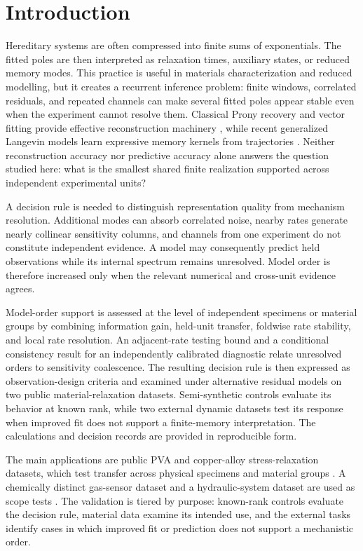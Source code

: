 \documentclass[11pt]{article}
\begin{document}
\section{Introduction}
Hereditary systems are often compressed into finite sums of exponentials. The fitted poles are then interpreted as relaxation times, auxiliary states, or reduced memory modes. This practice is useful in materials characterization and reduced modelling, but it creates a recurrent inference problem: finite windows, correlated residuals, and repeated channels can make several fitted poles appear stable even when the experiment cannot resolve them. Classical Prony recovery and vector fitting provide effective reconstruction machinery \cite{stampfer2020gop,gustavsen1999vector,bosner2021parallel}, while recent generalized Langevin models learn expressive memory kernels from trajectories \cite{lei2016parameterization,ge2024state,lang2026learning}. Neither reconstruction accuracy nor predictive accuracy alone answers the question studied here: what is the smallest shared finite realization supported across independent experimental units?

A decision rule is needed to distinguish representation quality from mechanism resolution. Additional modes can absorb correlated noise, nearby rates generate nearly collinear sensitivity columns, and channels from one experiment do not constitute independent evidence. A model may consequently predict held observations while its internal spectrum remains unresolved. Model order is therefore increased only when the relevant numerical and cross-unit evidence agrees.

Model-order support is assessed at the level of independent specimens or material groups by combining information gain, held-unit transfer, foldwise rate stability, and local rate resolution. An adjacent-rate testing bound and a conditional consistency result for an independently calibrated diagnostic relate unresolved orders to sensitivity coalescence. The resulting decision rule is then expressed as observation-design criteria and examined under alternative residual models on two public material-relaxation datasets. Semi-synthetic controls evaluate its behavior at known rank, while two external dynamic datasets test its response when improved fit does not support a finite-memory interpretation. The calculations and decision records are provided in reproducible form.

The main applications are public PVA and copper-alloy stress-relaxation datasets, which test transfer across physical specimens and material groups \cite{schelkow2026pva,kupferdigital2024relaxation}. A chemically distinct gas-sensor dataset and a hydraulic-system dataset are used as scope tests \cite{uci308gas,ziyatdinov2015dataset,ziyatdinov2015bioinspired,helwig2015hydraulic}. The validation is tiered by purpose: known-rank controls evaluate the decision rule, material data examine its intended use, and the external tasks identify cases in which improved fit or prediction does not support a mechanistic order.
\end{document}
